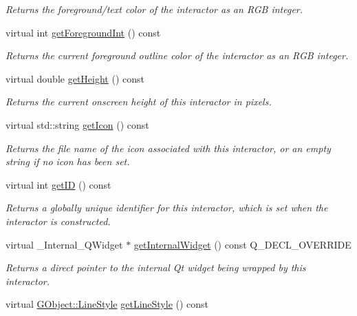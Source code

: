 \begin{DoxyCompactItemize}
\begin{DoxyCompactList}\small\item\em Returns the foreground/text color of the interactor as an R\+GB integer. \end{DoxyCompactList}\item 
virtual int \mbox{\hyperlink{classGDrawingSurface_ac3b12ab385a6ef9ae90fc879860ba726}{get\+Foreground\+Int}} () const
\begin{DoxyCompactList}\small\item\em Returns the current foreground outline color of the interactor as an R\+GB integer. \end{DoxyCompactList}\item 
virtual double \mbox{\hyperlink{classGInteractor_a1e7e353362434072875264cf95629f99}{get\+Height}} () const
\begin{DoxyCompactList}\small\item\em Returns the current onscreen height of this interactor in pixels. \end{DoxyCompactList}\item 
virtual std\+::string \mbox{\hyperlink{classGInteractor_aaed62a73004939a64da6f0eb9eb64d73}{get\+Icon}} () const
\begin{DoxyCompactList}\small\item\em Returns the file name of the icon associated with this interactor, or an empty string if no icon has been set. \end{DoxyCompactList}\item 
virtual int \mbox{\hyperlink{classGInteractor_a9c9659a6c6ba66b4107ba59c95a24241}{get\+ID}} () const
\begin{DoxyCompactList}\small\item\em Returns a globally unique identifier for this interactor, which is set when the interactor is constructed. \end{DoxyCompactList}\item 
virtual \+\_\+\+Internal\+\_\+\+Q\+Widget $\ast$ \mbox{\hyperlink{classGCanvas_a208ce13c1da40bf0ddb509daf99d6588}{get\+Internal\+Widget}} () const Q\+\_\+\+D\+E\+C\+L\+\_\+\+O\+V\+E\+R\+R\+I\+DE
\begin{DoxyCompactList}\small\item\em Returns a direct pointer to the internal Qt widget being wrapped by this interactor. \end{DoxyCompactList}\item 
virtual \mbox{\hyperlink{classGObject_a86e0f5648542856159bb40775c854aa7}{G\+Object\+::\+Line\+Style}} \mbox{\hyperlink{classGDrawingSurface_aaf1f5ea8281e5e3486662878d26f0a13}{get\+Line\+Style}} () const

\end{DoxyCompactItemize}
